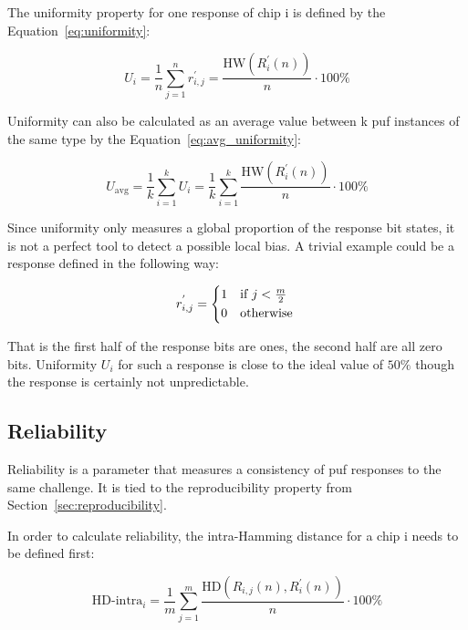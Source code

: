 The uniformity property for one response of chip i is defined by the Equation~\ref{eq:uniformity}:

\begin{equation}\label{eq:uniformity}
    U_{i} = \frac{1}{n}\sum_{j=1}^{n}r_{i,j}^{'} = \frac{\textrm{HW}(R_{i}^{'}(n))}{n} \cdot 100\% 
\end{equation}

Uniformity can also be calculated as an average value between k \gls{puf} instances of the same type by the Equation~\ref{eq:avg_uniformity}\cite{Maiti2011}:

\begin{equation}\label{eq:avg_uniformity}
    U_{\textrm{avg}} = \frac{1}{k}\sum_{i=1}^{k}U_{i} = \frac{1}{k}\sum_{i=1}^{k}\frac{\textrm{HW}(R_{i}^{'}(n))}{n} \cdot 100\%
\end{equation}

Since uniformity only measures a global proportion of the response bit states, it is not a perfect tool to detect a possible local bias. A trivial example could be a response defined in the following way:

\begin{equation}
    r_{i, j}^{'} =
    \begin{cases*}
        1 & if $j < \frac{m}{2}$ \\
        0 & otherwise
    \end{cases*}
\end{equation}

That is the first half of the response bits are ones, the second half are all zero bits. Uniformity $U_{i}$ for such a response is close to the ideal value of $50\%$ though the response is certainly not unpredictable.

\subsection{Reliability}\label{sec:reliability}

Reliability is a parameter that measures a consistency of \gls{puf} responses to the same challenge. It is tied to the reproducibility property from Section~\ref{sec:reproducibility}.

In order to calculate reliability, the intra-Hamming distance for a chip i needs to be defined first\cite{Maiti2011}: 

\begin{equation}\label{eq:hd_intra}
    \textrm{HD-intra}_{i} = \frac{1}{m} \sum_{j=1}^{m}\frac{\textrm{HD}(R_{i,j}(n), R_{i}^{'}(n))}{n} \cdot 100 \%
\end{equation}

